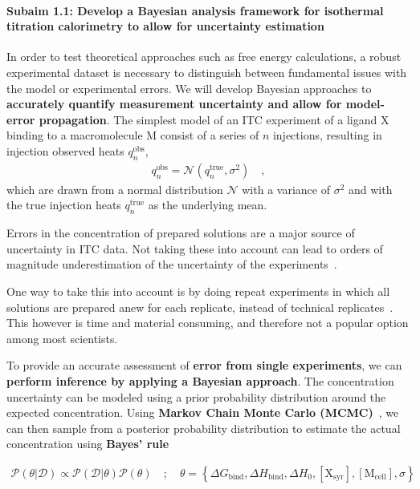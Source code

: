 \documentclass[10pt,final]{article}
\newcommand{\subsubsubsection}[1]{\paragraph*{#1}}
\begin{document}
\subsubsubsection{Subaim 1.1: Develop a Bayesian analysis framework for isothermal titration calorimetry to allow for uncertainty estimation}
In order to test theoretical approaches such as free energy calculations, a robust experimental dataset is necessary to distinguish between fundamental issues with the model or experimental errors. 
We will develop Bayesian approaches to \textbf{accurately quantify measurement uncertainty and allow for model-error propagation}. 
The simplest model of an ITC experiment of a ligand $\mathrm{X}$ binding to a macromolecule $\mathrm{M}$ consist of a series of $n$ injections, resulting in injection observed heats $q_n^\mathrm{obs}$,
\begin{align}
	q_n^\mathrm{obs} = \mathcal{N}(q_n^\mathrm{true}, \sigma^2) \quad ,
\end{align}
which are drawn from a normal distribution $\mathcal{N}$ with a variance of $\sigma^2$ and with the true injection heats $q_n^\mathrm{true}$ as the underlying mean.

Errors in the concentration of prepared solutions are a major source of uncertainty in ITC data. Not taking these into account can lead to orders of magnitude underestimation of the uncertainty of the experiments~\cite{Myszka2003a,Tellinghuisen2011a}.

One way to take this into account is by doing repeat experiments in which all solutions are prepared anew for each replicate, instead of technical replicates~\cite{Vaux2012a}. This however is time and material consuming, and therefore not a popular option among most scientists. 

To provide an accurate assessment of \textbf{error from single experiments}, we can \textbf{perform inference by applying a Bayesian approach}. The concentration uncertainty can be modeled using a prior probability distribution around the expected concentration. Using \textbf{Markov Chain Monte Carlo (MCMC)}~\cite{Metropolis1953a,Hastings1970a}, we can then sample from a posterior probability distribution to estimate the actual concentration using\textbf{ Bayes' rule}

\begin{align}
	\mathcal{P}\left(\theta | \mathcal{D} \right) \propto  \mathcal{P}(\mathcal{D} | \theta) \mathcal{P}\left(\theta\right) \quad;\quad \theta   =  \left\{ \Delta G_\mathrm{bind}, \Delta H_\mathrm{bind}, \Delta H_0, [\mathrm{X_{syr}}], [\mathrm{M_{cell}}], \sigma \right\}
\end{align}
\end{document}
